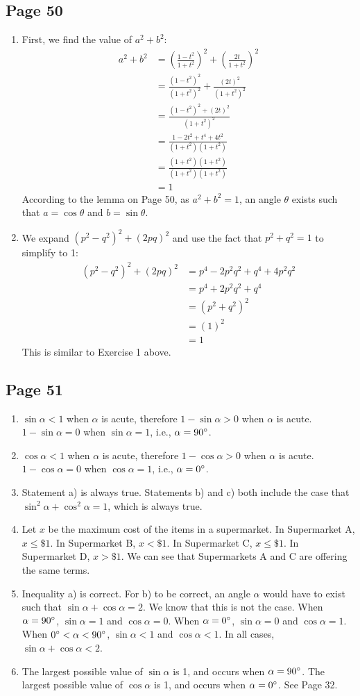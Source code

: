 \documentclass{article}
\newenvironment{solutions}[1]
{\subsection*{#1}
 \begin{enumerate}[leftmargin=1.5em]}
{\end{enumerate}}
\newcommand{\solution}{\item}
\begin{document}
\begin{solutions}{Page 50}
\solution %
First, we find the value of $a^2 + b^2$:
\begin{align*}
a^2 + b^2 &= \left(\frac{1 - t^2}{1 + t^2}\right)^2 + \left(\frac{2t}{1 + t^2}\right)^2 \\[1ex]
&= \frac{(1 - t^2)^2}{(1 + t^2)^2} + \frac{(2t)^2}{(1 + t^2)^2} \\[1ex]
&= \frac{(1 - t^2)^2 + (2t)^2}{(1 + t^2)^2} \\[1ex]
&= \frac{1 - 2t^2 + t^4 + 4t^2}{(1 + t^2)(1 + t^2)} \\[1ex]
&= \frac{(1 + t^2)(1 + t^2)}{(1 + t^2)(1 + t^2)} \\
&= 1
\end{align*}
According to the lemma on Page 50, as $a^2 + b^2 = 1$, an angle $\theta$ exists such that $a = \cos{\theta}$ and $b = \sin{\theta}$.

\solution %
We expand $(p^2 - q^2)^2 + (2pq)^2$ and use the fact that $p^2 + q^2 = 1$ to simplify to 1:
\begin{align*}
(p^2 - q^2)^2 + (2pq)^2 &= p^{4} - 2p^2q^2 + q^4 + 4p^2q^2 \\
&= p^{4} + 2p^2q^2 + q^4 \\
&= (p^2 + q^2)^2 \\
&= (1)^2 \\
&= 1
\end{align*}
This is similar to Exercise 1 above.

\end{solutions}


\begin{solutions}{Page 51}
\solution %
$\sin{\alpha} < 1$ when $\alpha$ is acute, therefore $1 - \sin{\alpha} > 0$ when $\alpha$ is acute. $1 - \sin{\alpha} = 0$ when $\sin{\alpha} = 1$, i.e., $\alpha = 90\degree$.

\solution %
$\cos{\alpha} < 1$ when $\alpha$ is acute, therefore $1 - \cos{\alpha} > 0$ when $\alpha$ is acute. $1 - \cos{\alpha} = 0$ when $\cos{\alpha} = 1$, i.e., $\alpha = 0\degree$.

\solution %
Statement a) is always true. Statements b) and c) both include the case that $\sin^{2}{\alpha} + \cos^{2}{\alpha} = 1$, which is always true.

\solution %
Let $x$ be the maximum cost of the items in a supermarket. In Supermarket A, $x \leq \$1$. In Supermarket B, $x < \$1$. In Supermarket C, $x \leq \$1$. In Supermarket D, $x > \$1$. We can see that Supermarkets A and C are offering the same terms.

\solution %
Inequality a) is correct. For b) to be correct, an angle $\alpha$ would have to exist such that $\sin{\alpha} + \cos{\alpha} = 2$.
We know that this is not the case. When $\alpha = 90\degree$, $\sin{\alpha} = 1$ and $\cos{\alpha} = 0$. When $\alpha = 0\degree$, $\sin{\alpha} = 0$ and $\cos{\alpha} = 1$. When $0\degree < \alpha < 90\degree$, $\sin{\alpha} < 1$ and $\cos{\alpha} < 1$. In all cases, $\sin{\alpha} + \cos{\alpha} < 2$.

\solution %
The largest possible value of $\sin{\alpha}$ is 1, and occurs when $\alpha = 90\degree$. The largest possible value of $\cos{\alpha}$ is 1, and occurs when $\alpha = 0\degree$.
See Page 32.
\end{solutions}
\end{document}
